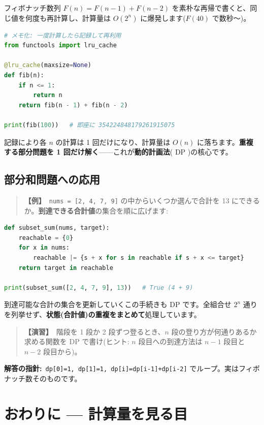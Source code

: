 \documentclass{article}
\begin{document}
フィボナッチ数列 \(F(n) = F(n-1) + F(n-2)\) を素朴な再帰で書くと、同じ値を何度も再計算し、計算量は \(O(2^n)\) に爆発します(\(F(40)\) で数秒〜)。

\begin{lstlisting}[language=Python]
# メモ化: 一度計算したら記録して再利用
from functools import lru_cache

@lru_cache(maxsize=None)
def fib(n):
    if n <= 1:
        return n
    return fib(n - 1) + fib(n - 2)

print(fib(100))   # 即座に 354224848179261915075
\end{lstlisting}

記録により各 \(n\) の計算は 1 回だけになり、計算量は \(O(n)\) に落ちます。\textbf{重複する部分問題を 1 回だけ解く}——これが\textbf{動的計画法}( DP )の核心です。

\subsection{部分和問題への応用}

\begin{quote}
\textbf{【例】}\ \texttt{nums = [2, 4, 7, 9]} の中からいくつか選んで合計を 13 にできるか。\textbf{到達できる合計値}の集合を順に広げます:
\end{quote}

\begin{lstlisting}[language=Python]
def subset_sum(nums, target):
    reachable = {0}
    for x in nums:
        reachable |= {s + x for s in reachable if s + x <= target}
    return target in reachable

print(subset_sum([2, 4, 7, 9], 13))   # True (4 + 9)
\end{lstlisting}

到達可能な合計の集合を更新していくこの手続きも DP です。全組合せ \(2^n\) 通りを列挙せず、\textbf{状態(合計値)の重複をまとめて}処理しています。

\begin{quote}
\textbf{【演習】}\ 階段を 1 段か 2 段ずつ登るとき、\(n\) 段の登り方が何通りあるか求める関数を DP で書け(ヒント: \(n\) 段目への到達方法は \(n-1\) 段目と \(n-2\) 段目から)。
\end{quote}

\textbf{解答の指針:}\ \texttt{dp[0]=1, dp[1]=1, dp[i]=dp[i-1]+dp[i-2]} でループ。実はフィボナッチ数そのものです。

\section{おわりに — 計算量を見る目}
\end{document}

